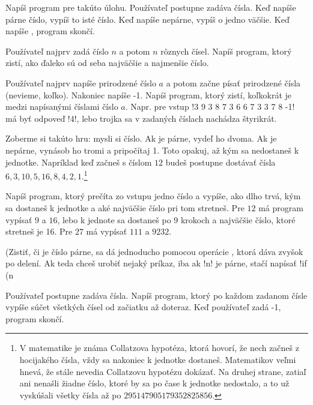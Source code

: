 \begin{uloha}
  Napíš program pre takúto úlohu.
  Používateľ postupne zadáva čísla. Keď napíše párne číslo, vypíš to isté číslo.
  Keď napíše nepárne, vypíš o jedno väčšie.
  Keď napíše , program skončí.
\end{uloha}

\begin{uloha}
  Používateľ najprv zadá číslo $n$ a potom $n$ rôznych čísel. Napíš program, ktorý zistí,
  ako ďaleko sú od seba najväčšie a najmenšie číslo.
\end{uloha}

\begin{uloha}
  Používateľ najprv napíše prirodzené číslo $a$ a potom začne písať
  prirodzené čísla (nevieme, koľko). Nakoniec napíše -1.
  Napíš program, ktorý zistí, koľkokrát je medzi napísanými číslami
  číslo $a$. Napr. pre vstup \prg!3 9 3 8 7 3 6 6 7 3 3 7 8 -1!
  má byť odpoveď \prg!4!, lebo trojka sa v zadaných číslach 
  nachádza štyrikrát.
\end{uloha}

\begin{uloha}
  \label{uloha:collatz}
  Zoberme si takúto hru: mysli si číslo. Ak je párne, vydeľ ho dvoma. Ak je nepárne,
  vynásob ho tromi a pripočítaj 1. Toto opakuj, až kým sa nedostaneš k jednotke.
  Napríklad keď začneš s číslom $12$ budeš postupne dostávať čísla
  $6, 3, 10, 5, 16, 8, 4, 2, 1$.\footnote{V matematike je známa
  Collatzova hypotéza, ktorá 
  hovorí, že nech začneš z hocijakého čísla, vždy sa nakoniec k jednotke dostaneš.
  Matematikov veľmi hnevá, že stále nevedia Collatzovu hypotézu dokázať.
  Na druhej strane, zatiaľ ani nenašli žiadne číslo, ktoré
  by sa po čase k jednotke nedostalo, a to už vyskúšali všetky čísla až po
  $295147905179352825856$. }

  Napíš program, ktorý prečíta zo vstupu jedno číslo a vypíše, ako dlho trvá, kým
  sa dostaneš k jednotke a aké najväčšie číslo pri tom stretneš. Pre $12$
  má program vypísať $9$ a $16$, lebo k jednote sa dostaneš po $9$ krokoch a 
  najväčšie číslo, ktoré stretneš je 16. Pre $27$ má vypísať $111$ a $9232$.

  (Zistiť, či je číslo párne, sa dá jednoducho pomocou operácie \vb{\%}, ktorá
  dáva zvyšok po delení. Ak teda chceš urobiť nejaký príkaz, iba ak \prg!n!
  je párne, stačí napísať \prg!if (n %
\end{uloha}

\begin{uloha} Používateľ postupne zadáva čísla. Napíš program, ktorý
  po každom zadanom čísle vypíše súčet všetkých čísel od začiatku až doteraz.
  Keď používateľ zadá -1, program skončí.
\end{uloha}

